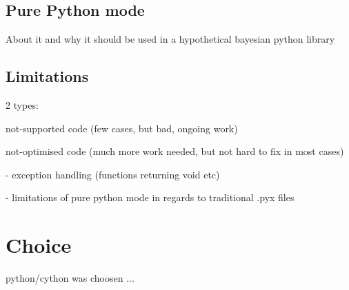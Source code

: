 \subsection{Pure Python mode}

About it and why it should be used in a hypothetical bayesian python library

\subsection{Limitations}

2 types:

	not-supported code (few cases, but bad, ongoing work)

	not-optimised code (much more work needed, but not hard to fix in most cases)

		- exception handling (functions returning void etc)

		- limitations of pure python mode in regards to traditional .pyx files

\section{Choice}

python/cython was choosen ...
